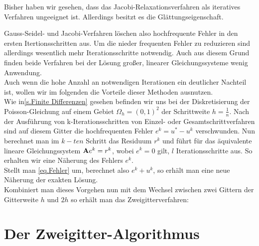 Bisher haben wir gesehen, dass das Jacobi-Relaxationsverfahren als iteratives Verfahren ungeeignet ist. Allerdings besitzt es die Glättungseigenschaft.

Gauss-Seidel- und Jacobi-Verfahren löschen also hochfrequente Fehler in den ersten Itertionsschritten aus. Um die nieder frequenten Fehler zu reduzieren sind allerdings wesentlich mehr Iterationsschritte notwendig. Auch aus diesem Grund finden beide Verfahren bei der Lösung großer, linearer Gleichungssysteme wenig Anwendung. \\
Auch wenn die hohe Anzahl an notwendigen Iterationen ein deutlicher Nachteil ist, wollen wir im folgenden die Vorteile dieser Methoden ausnutzen. \\%
Wie in\autoref{s.Finite Differenzen} gesehen befinden wir uns bei der Diskretisierung der Poisson-Gleichung auf einem Gebiet $\Omega_{h} = (0,1)^{2}$ der Schrittweite $h = \frac {1} {n}$. Nach der Ausführung von k-Iterationsschritten von Einzel- oder Gesamtschrittverfahren sind auf diesem Gitter die hochfrequenten Fehler $e^{k} = u^{*} - u^{k}$ verschwunden. Nun berechnet man im $k-ten$ Schritt das Residuum $r^{k}$ und führt für das äquivalente lineare Gleichungssystem ${\textbf{A}}e^{k} = r^{k}$, wobei $e^{k} = 0$ gilt, $l$ Iterationsschritte aus. So erhalten wir eine Näherung des Fehlers $e^{k}$. \\
Stellt man \autoref{eq.Fehler} um, berechnet also $e^{k} + u^{k}$, so erhält man eine neue Näherung der exakten Lösung. \\
Kombiniert man dieses Vorgehen nun mit dem Wechsel zwischen zwei Gittern der Gitterweite $h$ und $2h$ so erhält man das Zweigitterverfahren:

\section{Der Zweigitter-Algorithmus}\label{s.Der Zweigitter-Algorithmus}

